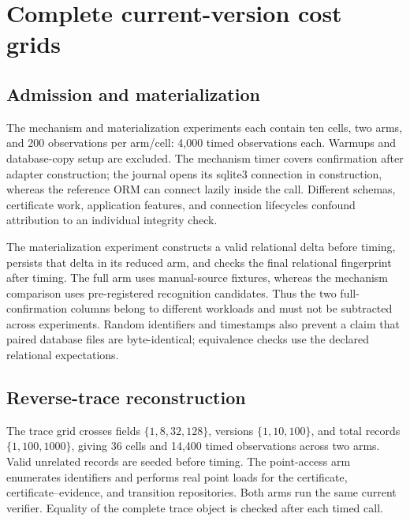 \documentclass[11pt,a4paper]{article}
\begin{document}
\section{Complete current-version cost grids}
\label{app:cost-grids}

\subsection{Admission and materialization}

The mechanism and materialization experiments each contain ten cells, two arms, and 200 observations per arm/cell: 4,000 timed observations each. Warmups and database-copy setup are excluded. The mechanism timer covers confirmation after adapter construction; the journal opens its sqlite3 connection in construction, whereas the reference ORM can connect lazily inside the call. Different schemas, certificate work, application features, and connection lifecycles confound attribution to an individual integrity check.



The materialization experiment constructs a valid relational delta before timing, persists that delta in its reduced arm, and checks the final relational fingerprint after timing. The full arm uses manual-source fixtures, whereas the mechanism comparison uses pre-registered recognition candidates. Thus the two full-confirmation columns belong to different workloads and must not be subtracted across experiments. Random identifiers and timestamps also prevent a claim that paired database files are byte-identical; equivalence checks use the declared relational expectations.



\subsection{Reverse-trace reconstruction}

The trace grid crosses fields $\{1,8,32,128\}$, versions $\{1,10,100\}$, and total records $\{1,100,1000\}$, giving 36 cells and 14,400 timed observations across two arms. Valid unrelated records are seeded before timing. The point-access arm enumerates identifiers and performs real point loads for the certificate, certificate--evidence, and transition repositories. Both arms run the same current verifier. Equality of the complete trace object is checked after each timed call.
\end{document}
